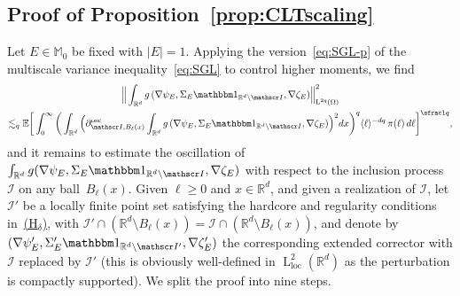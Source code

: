 \documentclass[JEP,XML,SOM,Unicode,published]{cedram}
\let\mathcal\mathscr
\newcommand{\Hd}{\hyperref[Hd]{\textup{(H$_\delta$)}}\xspace}
\let\mathds\mathbbm
\theoremstyle{plain}
\theoremstyle{definition}
\newcommand{\R}{\mathbb R}
\newcommand{\Ic}{\mathcal I}
\newcommand{\Md}{\mathbb M}
\newcommand{\loc}{{\operatorname{loc}}}
\newcommand{\Ld}{\operatorname{L}}
\newcommand{\E}{\mathbb{E}}
\begin{document}
\subsection{Proof of Proposition~\ref{prop:CLTscaling}}
Let $E\in\Md_0$ be fixed with $|E|=1$.
Applying the version~\eqref{eq:SGL-p} of the multiscale variance inequality~\eqref{eq:SGL} to control higher moments, we find
\begin{multline}\label{eq:SG-phi}
\Big\|\int_{\R^d}g\,(\nabla \psi_E,\Sigma_E\mathds1_{\R^d\setminus\Ic},\nabla\zeta_E)\Big\|_{\Ld^{2q}(\Omega)}^{2}\\
\lesssim_q \E\bigg[\int_0^\infty\bigg(\int_{\R^d}\Big(\partial^{\operatorname{osc}}_{\Ic ,B_\ell(x)}\int_{\R^d}g\,(\nabla \psi_E,\Sigma_E\mathds1_{\R^d\setminus\Ic},\nabla\zeta_E)\Big)^2dx\bigg)^q\langle\ell\rangle^{-dq}\,\pi(\ell)\,d\ell\bigg]^{\sfrac1q},
\end{multline}
and it remains to estimate the oscillation of $\int_{\R^d} g(\nabla \psi_E,\Sigma_E\mathds1_{\R^d\setminus\Ic},\nabla\zeta_E)$ with respect to the inclusion process $\Ic $ on any ball~$B_\ell(x)$.
Given $\ell\ge0$ and $x\in\R^d$, and given a realization of $\Ic$, let $\Ic '$ be a locally finite point set satisfying the hardcore and regularity conditions in~\Hd, with $\Ic '\cap(\R^d\setminus B_\ell(x))=\Ic \cap(\R^d\setminus B_\ell(x))$, and denote by~$(\nabla\psi'_E,\Sigma_E'\mathds1_{\R^d\setminus\Ic'},\nabla\zeta_E')$ the corresponding extended corrector with $\Ic $ replaced by $\Ic'$ (this is obviously well-defined in $\Ld^2_\loc(\R^d)$ as the perturbation is compactly supported).
We split the proof into nine steps.
\end{document}
